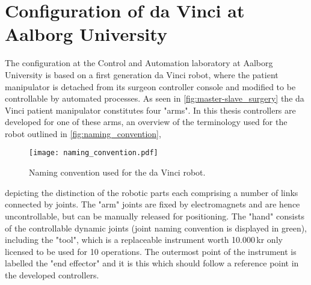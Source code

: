 


%
%
%

\vspace{-2mm}
\section{Configuration of da Vinci at Aalborg University}\label{sec:technical_overview}

\vspace{-2mm}
The configuration at the Control and Automation laboratory at Aalborg University is based on a first generation da Vinci robot, where the patient manipulator is detached from its surgeon controller console and modified to be controllable by automated processes. %
As seen in \autoref{fig:master-slave_surgery} the da Vinci patient manipulator constitutes four "arms". In this thesis controllers are developed for one of these arms, 
an overview of the terminology used for the robot  outlined in \autoref{fig:naming_convention},
\begin{figure}[htbp]
\centering
\texttt{[image: naming\_convention.pdf]}
\caption{Naming convention used for the da Vinci robot.}
\label{fig:naming_convention}
\end{figure}
depicting the distinction of the robotic parts each comprising a number of links connected by joints. 
The  "arm"  joints are fixed by electromagnets and are hence uncontrollable, but can be manually released for positioning. 
The  "hand" consists of the controllable dynamic joints (joint naming convention is displayed in green), including the "tool", which is a replaceable instrument worth 10.000\,kr only licensed to be used for 10 operations. The outermost point of the instrument is labelled the "end effector" and it is  this which should follow a reference point in the developed controllers.

